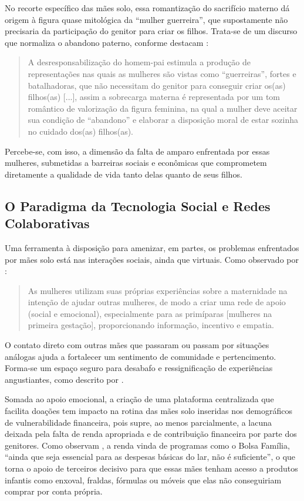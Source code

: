 No recorte específico das mães solo, essa romantização do sacrifício materno dá origem à figura quase mitológica da ``mulher guerreira'', que supostamente não precisaria da participação do genitor para criar os filhos. Trata-se de um discurso que normaliza o abandono paterno, conforme destacam \textcite[9-10]{araujo2025}:
\begin{quote}
A desresponsabilização do homem-pai estimula a produção de representações nas quais as mulheres são vistas como ``guerreiras'', fortes e batalhadoras, que não necessitam do genitor para conseguir criar os(as) filhos(as) [...], assim a sobrecarga materna é representada por um tom romântico de valorização da figura feminina, na qual a mulher deve aceitar sua condição de ``abandono'' e elaborar a disposição moral de estar sozinha no cuidado dos(as) filhos(as).
\end{quote}

Percebe-se, com isso, a dimensão da falta de amparo enfrentada por essas mulheres, submetidas a barreiras sociais e econômicas que comprometem diretamente a qualidade de vida tanto delas quanto de seus filhos.

\subsection{O Paradigma da Tecnologia Social e Redes Colaborativas}
Uma ferramenta à disposição para amenizar, em partes, os problemas enfrentados por mães solo está nas interações sociais, ainda que virtuais. Como observado por \textcite[694]{brito2022}:
\begin{quote}
As mulheres utilizam suas próprias experiências sobre a maternidade na intenção de ajudar outras mulheres, de modo a criar uma rede de apoio (social e emocional), especialmente para as primíparas [mulheres na primeira gestação], proporcionando informação, incentivo e empatia.
\end{quote}
O contato direto com outras mães que passaram ou passam por situações análogas ajuda a fortalecer um sentimento de comunidade e pertencimento. Forma-se um espaço seguro para desabafo e ressignificação de experiências angustiantes, como descrito por \textcite[6]{araujo2025}.

Somada ao apoio emocional, a criação de uma plataforma centralizada que facilita doações tem impacto na rotina das mães solo inseridas nos demográficos de vulnerabilidade financeira, pois supre, ao menos parcialmente, a lacuna deixada pela falta de renda apropriada e de contribuição financeira por parte dos genitores. Como observam \textcite[9]{araujo2025}, a renda vinda de programas como o Bolsa Família, “ainda que seja essencial para as despesas básicas do lar, não é suficiente”, o que torna o apoio de terceiros decisivo para que essas mães tenham acesso a produtos infantis como enxoval, fraldas, fórmulas ou móveis que elas não conseguiriam comprar por conta própria.

